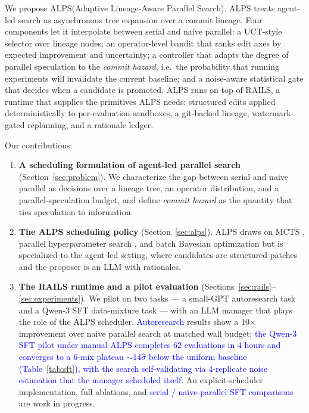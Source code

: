 \documentclass{article}
\newcommand{\alps}{ALPS\xspace}
\newcommand{\rails}{RAILS\xspace}
\newcommand{\added}[1]{\textcolor{blue}{#1}}
\begin{document}
We propose \alps (Adaptive Lineage-Aware Parallel Search). \alps treats agent-led search as asynchronous tree expansion over a commit lineage. Four components let it interpolate between serial and naive parallel: a UCT-style selector over lineage nodes; an operator-level bandit that ranks edit axes by expected improvement and uncertainty; a controller that adapts the degree of parallel speculation to the \emph{commit hazard}, i.e.\ the probability that running experiments will invalidate the current baseline; and a noise-aware statistical gate that decides when a candidate is promoted. \alps runs on top of \rails, a runtime that supplies the primitives \alps needs: structured edits applied deterministically to per-evaluation sandboxes, a git-backed lineage, watermark-gated replanning, and a rationale ledger.

Our contributions:

\begin{enumerate}[leftmargin=*,itemsep=2pt]
  \item \textbf{A scheduling formulation of agent-led parallel search} (Section~\ref{sec:problem}). We characterize the gap between serial and naive parallel as decisions over a lineage tree, an operator distribution, and a parallel-speculation budget, and define \emph{commit hazard} as the quantity that ties speculation to information.
  \item \textbf{The \alps scheduling policy} (Section~\ref{sec:alps}). \alps draws on MCTS \citep{uct}, parallel hyperparameter search \citep{hyperband,asha,pbt}, and batch Bayesian optimization \citep{thompson_batch_bo} but is specialized to the agent-led setting, where candidates are structured patches and the proposer is an LLM with rationales.
  \item \textbf{The \rails runtime and a pilot evaluation} (Sections~\ref{sec:rails}--\ref{sec:experiments}). We pilot on two tasks --- a small-GPT autoresearch task \citep{karpathy_autoresearch} and a Qwen-3 SFT data-mixture task \citep{qwen3,tulu3} --- with an LLM manager that plays the role of the \alps scheduler. \added{Autoresearch} results show a 10$\times$ improvement over naive parallel search at matched wall budget; \added{the Qwen-3 SFT pilot under manual \alps completes 62 evaluations in 4 hours and converges to a 6-mix plateau $\sim$14$\hat\sigma$ below the uniform baseline (Table~\ref{tab:sft}), with the search self-validating via 4-replicate noise estimation that the manager scheduled itself.} An explicit-scheduler implementation, full ablations, and \added{serial / naive-parallel SFT comparisons} are work in progress.
\end{enumerate}
\end{document}
